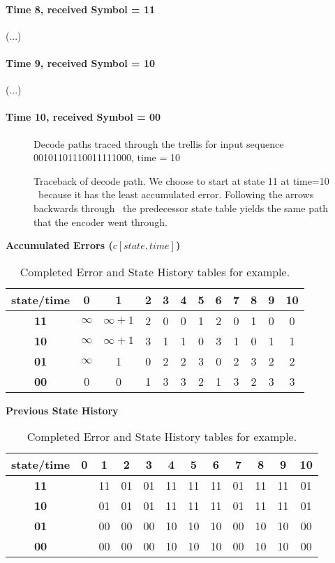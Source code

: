 \paragraph{Time 8, received Symbol = 11}
(...)
\paragraph{Time 9, received Symbol = 10}
(...)
\paragraph{Time 10, received Symbol = 00}
\begin{figure}
\center
\epsfxsize=5.5in
\caption{Decode paths traced through the trellis for input sequence 00101101110011111000, time = 10}
\label{fig:decode_time10}
\end{figure}





\begin{figure}
\center
\epsfxsize=5.5in
\caption{Traceback of decode path. We choose to start at state 11 at time=10 \
         because it has the least accumulated error. Following the arrows backwards through \
	 the predecessor state table yields the same path that the encoder went through.}
\label{fig:decode_traceback}
\end{figure}



\begin{table}
\center
\textbf{Accumulated Errors ($c[state,time]$)}
\begin{tabular}{c|c|c|c|c|c|c|c|c|c|c|c}
state/time & 0 & 1 & 2 & 3 & 4 & 5 & 6 & 7 & 8 & 9 & 10 \\
\hline
\textbf{11} & $\infty$ & $\infty+1$ & 2 & 0 & 0 & 1 & 2 & 0 & 1 & 0 & 0 \\
\hline
\textbf{10} & $\infty$ & $\infty+1$ & 3 & 1 & 1 & 0 & 3 & 1 & 0 & 1 & 1 \\
\hline
\textbf{01} & $\infty$ &          1 & 0 & 2 & 2 & 3 & 0 & 2 & 3 & 2 & 2 \\
\hline
\textbf{00} &        0 &          0 & 1 & 3 & 3 & 2 & 1 & 3 & 2 & 3 & 3 \\
\hline
\end{tabular}

\textbf{Previous State History}
\begin{tabular}{c|c|c|c|c|c|c|c|c|c|c|c}
state/time & 0 & 1 & 2 & 3 & 4 & 5 & 6 & 7 & 8 & 9 & 10 \\
\hline
\textbf{11} & & 11 & 01 & 01 & 11 & 11 & 11 & 01 & 11 & 11 & 01 \\
\hline
\textbf{10} & & 01 & 01 & 01 & 11 & 11 & 11 & 01 & 11 & 11 & 01 \\
\hline
\textbf{01} & & 00 & 00 & 00 & 10 & 10 & 10 & 00 & 10 & 10 & 00 \\
\hline
\textbf{00} & & 00 & 00 & 00 & 10 & 10 & 10 & 00 & 10 & 10 & 00 \\
\hline
\end{tabular}

\caption{Completed Error and State History tables for example.}
\label{tbl:decode-state-tables}
\end{table}
